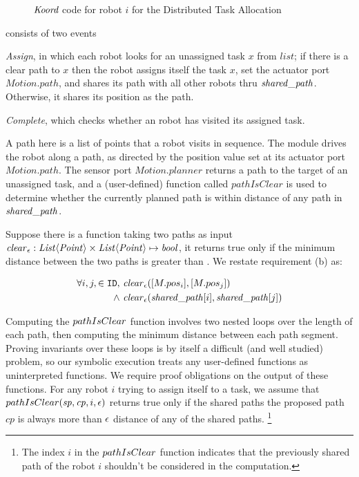 \begin{figure}[t]
    {
        
    }
    {
        
    }
    \caption{ $\emph{Koord}$ code for robot $i$ for the Distributed Task Allocation}
    \label{fig:taskapp}
\end{figure}

\Task consists of two events
\begin{inparaenum}[(1)]
    \item \emph{Assign}, in which each robot looks for an unassigned task $x$ from $\mathit{list}$;
    if there is a clear path to $x$ then the robot assigns itself the task $x$,
    set the actuator port $\mathit{Motion.path}$,
    and shares its path with all other robots thru $\mathit{shared\_path}$.
    Otherwise, it shares its position as the path.
    \item \emph{Complete}, which checks whether an robot has visited its assigned task.
\end{inparaenum}
A path here is a list of points that a robot visits in sequence.
The \Motion module drives the robot along a path,
as directed by the position value set at its actuator port $\mathit{Motion.path}$.
The sensor port $\mathit{Motion.planner}$ returns a path to the target of an unassigned task,
and a (user-defined) function called $\mathit{pathIsClear}$ is used to determine
whether the currently planned path is within \ds distance of any path in $\mathit{shared\_path}$.

\newcommand{\dist}{\mathit{clear}_\ds}
\newcommand{\pathIsClear}{\mathit\mathit{pathIsClear}}
Suppose there is a function taking two paths as input
$\dist : \mathit{List}\langle \mathit{Point}\rangle \times \mathit{List}\langle \mathit{Point}\rangle \mapsto \mathit{bool}$,
it returns true only if the minimum distance between the two paths is greater than \ds.
We restate requirement (b) as:
\begin{invariant}
\label{inv:task}
\begin{align*}
    \forall i,j, \in \UINS,&\ \dist([M.pos_i], [M.pos_j]) \\
                     \land &\ \dist(\pathvar[i], \pathvar[j])
\end{align*}
\end{invariant}
\noindent

Computing the $\pathIsClear$ function involves two nested loops over the length of each path,
then computing the minimum distance between each path segment.
Proving invariants over these loops is by itself a difficult (and well studied) problem,
so our symbolic execution treats any user-defined functions as uninterpreted functions.
We require proof obligations on the output of these functions.
For any robot $i$ trying to assign itself to a task,
we assume that $\pathIsClear(\mathit{sp}, \mathit{cp}, i, \ds)$ returns true
only if the shared paths the proposed path $\mathit{cp}$ is always more than $\epsilon$ distance of any of the shared paths.%
\footnote{The index $i$ in the $\pathIsClear$ function indicates that the previously shared path of the robot $i$ shouldn't be considered in the computation.}

